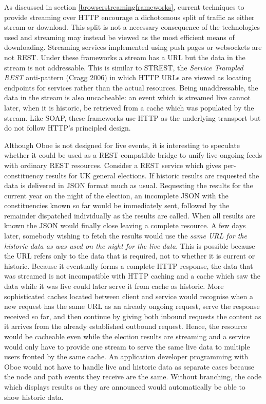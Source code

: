 \documentclass[12pt, ]{article}
\begin{document}
As discussed in section \ref{browserstreamingframeworks}, current
techniques to provide streaming over HTTP encourage a dichotomous split
of traffic as either stream or download. This split is not a necessary
consequence of the technologies used and streaming may instead be viewed
as the most efficient means of downloading. Streaming services
implemented using push pages or websockets are not REST. Under these
frameworks a stream has a URL but the data in the stream is not
addressable. This is similar to STREST, the \emph{Service Trampled REST}
anti-pattern (Cragg 2006) in which HTTP URLs are viewed as locating
endpoints for services rather than the actual resources. Being
unaddressable, the data in the stream is also uncacheable: an event
which is streamed live cannot later, when it is historic, be retrieved
from a cache which was populated by the stream. Like SOAP, these
frameworks use HTTP as the underlying transport but do not follow HTTP's
principled design.

Although Oboe is not designed for live events, it is interesting to
speculate whether it could be used as a REST-compatible bridge to unify
live-ongoing feeds with ordinary REST resources. Consider a REST service
which gives per-constituency results for UK general elections. If
historic results are requested the data is delivered in JSON format much
as usual. Requesting the results for the current year on the night of
the election, an incomplete JSON with the constituencies known so far
would be immediately sent, followed by the remainder dispatched
individually as the results are called. When all results are known the
JSON would finally close leaving a complete resource. A few days later,
somebody wishing to fetch the results would use the \emph{same URL for
the historic data as was used on the night for the live data}. This is
possible because the URL refers only to the data that is required, not
to whether it is current or historic. Because it eventually forms a
complete HTTP response, the data that was streamed is not incompatible
with HTTP caching and a cache which saw the data while it was live could
later serve it from cache as historic. More sophisticated caches located
between client and service would recognise when a new request has the
same URL as an already ongoing request, serve the response received so
far, and then continue by giving both inbound requests the content as it
arrives from the already established outbound request. Hence, the
resource would be cacheable even while the election results are
streaming and a service would only have to provide one stream to serve
the same live data to multiple users fronted by the same cache. An
application developer programming with Oboe would not have to handle
live and historic data as separate cases because the node and path
events they receive are the same. Without branching, the code which
displays results as they are announced would automatically be able to
show historic data.
\end{document}
